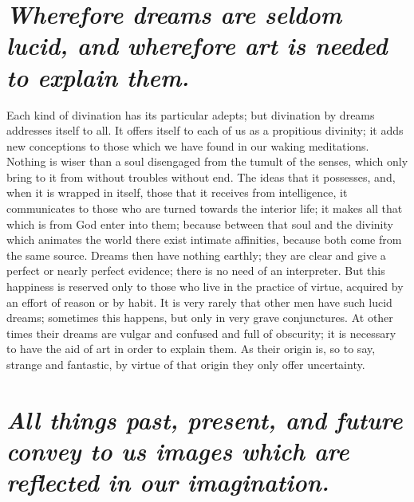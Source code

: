 \documentclass[12pt]{article}
\begin{document}
\section{\mdseries\itshape Wherefore dreams are seldom lucid, and wherefore art
is needed to explain them.}

Each kind of divination has its particular adepts; but divination by dreams
addresses itself to all. It offers itself to each of us as a propitious
divinity; it adds new conceptions to those which we have found in our waking
meditations. Nothing is wiser than a soul disengaged from the tumult of the
senses, which only bring to it from without troubles without end. The ideas
that it possesses, and, when it is wrapped in itself, those that it receives
from intelligence, it communicates to those who are turned towards the interior
life; it makes all that which is from God enter into them; because between that
soul and the divinity which animates the world there exist intimate affinities,
because both come from the same source. Dreams then have nothing earthly; they
are clear and give a perfect or nearly perfect evidence; there is no need of an
interpreter. But this happiness is reserved only to those who live in the
practice of virtue, acquired by an effort of reason or by habit. It is very
rarely that other men have such lucid dreams; sometimes this happens, but only
in very grave conjunctures. At other times their dreams are vulgar and confused
and full of obscurity; it is necessary to have the aid of art in order to
explain them. As their origin is, so to say, strange and fantastic, by virtue
of that origin they only offer uncertainty.


\section{\mdseries\itshape All things past, present, and future convey to us
images which are reflected in our imagination.}
\end{document}
